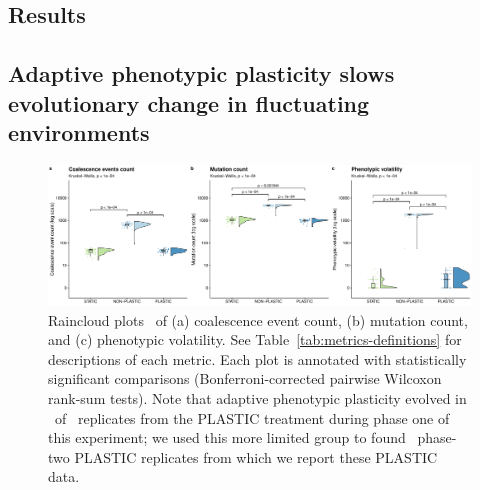 \begin{raggedbottom}

\section{Results}

\subsection{Adaptive phenotypic plasticity slows evolutionary change in fluctuating environments}

\begin{figure}[h!]
  \centering
  \includegraphics[width=1\textwidth]{02_consequences_of_plasticity/media/media-evolutionary-change-magnitude-panel.pdf}
  \caption{\small
  Raincloud plots~\citep{allen_raincloud_2019} of
  (a) coalescence event count,
  (b) mutation count,
  and (c) phenotypic volatility.
  See Table~\ref{tab:metrics-definitions} for descriptions of each metric.
  Each plot is annotated with statistically significant comparisons (Bonferroni-corrected pairwise Wilcoxon rank-sum tests).
  Note that adaptive phenotypic plasticity evolved in \evolutionaryChangeRatePlasticReps\ of \evolutionaryChangeRateReplicates\ replicates from the PLASTIC treatment during phase one of this experiment; we used this more limited group to found \evolutionaryChangeRatePlasticReps\ phase-two PLASTIC replicates from which we report these PLASTIC data.
  }
  \label{fig:evolutionary-dynamics-magnitude}
\end{figure}




\end{raggedbottom}
